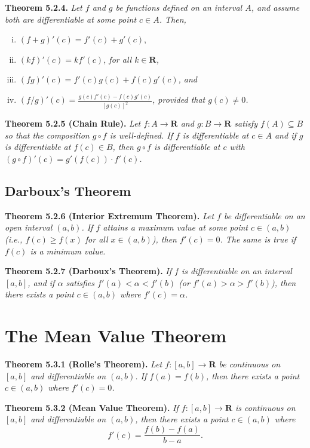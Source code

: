 \documentclass[12pt]{report}
\newcommand{\R}{\textbf{R}}
\begin{document}
\noindent \textbf{Theorem 5.2.4.} \textit{Let $f$ and $g$ be functions defined on an interval $A$, and assume both are differentiable at some point $c\in A$.  Then,}

\begin{enumerate}[(i)]
\item $(f+g)'(c)=f'(c)+g'(c)$,
\item \textit{$(kf)'(c)=kf'(c)$, for all $k\in\R$,}
\item \textit{$(fg)'(c)=f'(c)g(c)+f(c)g'(c)$, and}
\item \textit{$(f/g)'(c)=\frac{g(c)f'(c)-f(c)g'(c)}{[g(c)]^2}$, provided that $g(c)\neq 0$.}
\end{enumerate}
\bigskip

\noindent \textbf{Theorem 5.2.5 (Chain Rule).} \textit{Let $f:A\rightarrow\R$ and $g:B\rightarrow\R$ satisfy $f(A)\subseteq B$ so that the composition $g\circ f$ is well-defined. If $f$ is differentiable at $c\in A$ and if $g$ is differentiable at $f(c)\in B$, then $g\circ f$ is differentiable at $c$ with $(g\circ f)'(c)=g'(f(c))\cdot f'(c)$.}
\bigskip

\subsection*{Darboux's Theorem}

\noindent \textbf{Theorem 5.2.6 (Interior Extremum Theorem).} \textit{Let $f$ be differentiable on an open interval $(a,b)$. If $f$ attains a maximum value at some point $c\in(a,b)$ (i.e., $f(c)\geq f(x)$ for all $x\in(a,b)$), then $f'(c)=0$.  The same is true if $f(c)$ is a minimum value.}
\bigskip

\noindent \textbf{Theorem 5.2.7 (Darboux's Theorem).} \textit{If $f$ is differentiable on an interval $[a,b]$, and if $\alpha$ satisfies $f'(a)<\alpha<f'(b)$ (or $f'(a)>\alpha>f'(b)$), then there exists a point $c\in(a,b)$ where $f'(c)=\alpha$.}

\section{The Mean Value Theorem}

\noindent \textbf{Theorem 5.3.1 (Rolle's Theorem).} \textit{Let $f:[a,b]\rightarrow\R$ be continuous on $[a,b]$ and differentiable on $(a,b)$.  If $f(a)=f(b)$, then there exists a point $c\in(a,b)$ where $f'(c)=0$.}
\bigskip

\noindent \textbf{Theorem 5.3.2 (Mean Value Theorem).} \textit{If $f:[a,b]\rightarrow\R$ is continuous on $[a,b]$ and differentiable on $(a,b)$, then there exists a point $c\in(a,b)$ where}
\[f'(c)=\frac{f(b)-f(a)}{b-a}.\]
\bigskip
\end{document}
